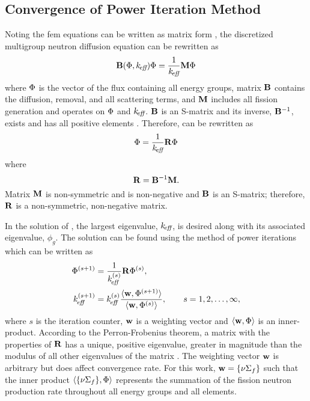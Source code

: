   \subsection{Convergence of Power Iteration Method}
    Noting the \gls{fem} equations can be written as matrix form
    , the discretized multigroup neutron diffusion 
    equation can be rewritten as 
    \begin{equation}
      \label{eq:gehin_notation}
      \mathbf{B}(\Phi,k_{\!\mbox{\scriptsize \em eff}}) \Phi = \frac{1}{k_{\!\mbox{\scriptsize \em eff}}} \mathbf{M} \Phi
    \end{equation}
    where $\Phi$ is the vector of the flux containing all energy groups, matrix 
    $\mathbf{B}$ contains the diffusion, removal, and all scattering terms, and $\mathbf{M}$ 
    includes all fission generation and operates on $\Phi$ and $k_{\!\mbox{\scriptsize \em eff}}$. $\mathbf{B}$
    is an S-matrix and its inverse, $\mathbf{B}^{-1}$, exists and has all positive 
    elements \cite{nakamura}. Therefore,  can be 
    rewritten as
    \begin{equation}
      \label{eq:gehin_solution}
      \Phi = \frac{1}{k_{\!\mbox{\scriptsize \em eff}}} \mathbf{R} \Phi
    \end{equation}
    where
    \begin{equation}
      \label{eq:gehin_r}
      \mathbf{R} = \mathbf{B}^{-1} \mathbf{M}.
    \end{equation}
    Matrix $\mathbf{M}$ is non-symmetric and is non-negative and $\mathbf{B}$ is an S-matrix;
    therefore, $\mathbf{R}$ is a non-symmetric, non-negative matrix.

    In the solution of , the largest eigenvalue,
    $k_{\!\mbox{\scriptsize \em eff}}$, is desired along with its associated eigenvalue, $\phi_g$. The
    solution can be found using the method of power iterations which can be
    written as 
    \begin{align}
      \label{eq:power_iteration_phi}
      \Phi^{(s+1)} &= \frac{1}{k_{\!\mbox{\scriptsize \em eff}}^{(s)}} \mathbf{R} \Phi^{(s)}, \\
      \label{eq:power_iteration_eigenvalue}
      k_{\!\mbox{\scriptsize \em eff}}^{(s+1)} &= k_{\!\mbox{\scriptsize \em eff}}^{(s)} \frac{\langle \mathbf{w}, \Phi^{(s+1)} \rangle}
        {\langle \mathbf{w}, \Phi^{(s)}\rangle}, \qquad s = 1,2,\ldots,\infty,
    \end{align}
    where $s$ is the iteration counter, $\mathbf{w}$ is a weighting vector and 
    $\langle\mathbf{w}, \Phi\rangle$ is an inner-product. According to the 
    Perron-Frobenius theorem, a matrix with the properties of $\mathbf{R}$ has a 
    unique, positive eigenvalue, greater in magnitude than the modulus of all 
    other eigenvalues of the matrix \cite{gehinThesis,nakamura}. The weighting 
    vector $\mathbf{w}$ is arbitrary but does affect convergence rate. For this work,
    $\mathbf{w} = \{\nu \Sigma_f\}$ such that the inner product $\langle\{\nu
    \Sigma_f\}, \Phi\rangle$ represents the summation of the fission neutron
    production rate throughout all energy groups and all elements. 
    
